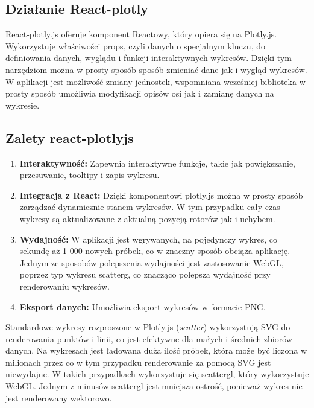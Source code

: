 \subsection{Działanie React-plotly}
React-plotly.js oferuje komponent Reactowy, który opiera się na Plotly.js. Wykorzystuje właściwości props, czyli danych o specjalnym kluczu, do definiowania danych, wyglądu i funkcji interaktywnych wykresów. Dzięki tym narzędziom można w prosty sposób sposób zmieniać dane jak i wygląd wykresów. W aplikacji jest możliwość zmiany jednostek, wspomniana wcześniej biblioteka w prosty sposób umożliwia modyfikacji opisów osi jak i zamianę danych na wykresie.
\subsection{Zalety react-plotlyjs}
\begin{enumerate}
    \item \textbf{Interaktywność:} Zapewnia interaktywne funkcje, takie jak powiększanie, przesuwanie, tooltipy i zapis wykresu.
    \item \textbf{Integracja z React:} Dzięki komponentowi plotly.js można w prosty sposób zarządzać dynamicznie stanem wykresów. W tym przypadku cały czas wykresy są aktualizowane z aktualną pozycją rotorów jak i uchybem.
    \item \textbf{Wydajność:} W aplikacji jest wgrywanych, na pojedynczy wykres, co sekundę aż 1 000 nowych próbek, co w znaczny sposób obciąża aplikację. Jednym ze sposobów polepszenia wydajności jest zastosowanie WebGL, poprzez typ wykresu scatterg, co znacząco polepsza wydajność przy renderowaniu wykresów.
    \item \textbf{Eksport danych:} Umożliwia eksport wykresów w formacie PNG.
\end{enumerate}
Standardowe wykresy rozproszone w Plotly.js (\textit{scatter}) wykorzystują SVG do renderowania punktów i linii, co jest efektywne dla małych i średnich zbiorów danych. Na wykresach jest ładowana duża ilość próbek, która może być liczona w milionach przez co w tym przypadku renderowanie za pomocą SVG jest niewydajne. W takich przypadkach wykorzystuje się scattergl, który wykorzystuje WebGL.
Jednym z minusów scattergl jest mniejsza ostrość, ponieważ wykres nie jest renderowany wektorowo.
